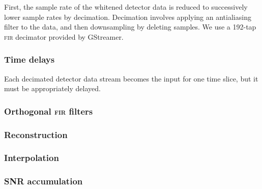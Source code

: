 First, the sample rate of the whitened detector data is reduced to successively
lower sample rates by decimation.  Decimation involves applying an antialiasing
filter to the data, and then downsampling by deleting samples.  We use a
192-tap \textsc{fir} decimator provided by GStreamer.

\subsubsection{Time delays}

Each decimated detector data stream becomes the input for one time slice, but
it must be appropriately delayed.

\subsubsection{Orthogonal \textsc{fir} filters}

\subsubsection{Reconstruction}

\subsubsection{Interpolation}

\subsubsection{SNR accumulation}

